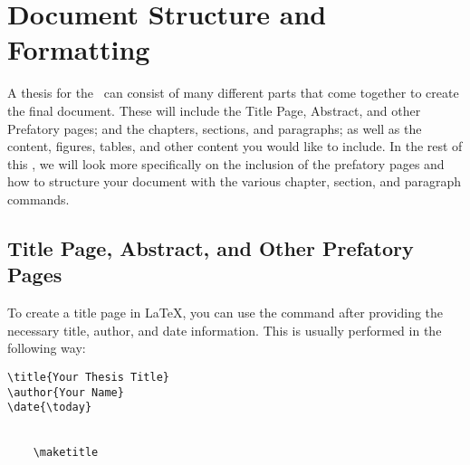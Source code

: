 \chapter{Document Structure and Formatting}\label{ch:documentstructure}
	A thesis for the \UofA\ can consist of many different parts that come together to create the final document.
	These will include the Title Page, Abstract, and other Prefatory pages; and the chapters, sections, and paragraphs; as well as the content, figures, tables, and other content you would like to include.
	In the rest of this , we will look more specifically on the inclusion of the prefatory pages and how to structure your document with the various chapter, section, and paragraph commands.
	
	\section{Title Page, Abstract, and Other Prefatory Pages}
		To create a title page in \LaTeX, you can use the  command after providing the necessary title, author, and date information. 
		This is usually performed in the following way:

		\begin{lstlisting}[style=LaTeXStyle]
\title{Your Thesis Title}
\author{Your Name}
\date{\today}


	\maketitle

		\end{lstlisting}

